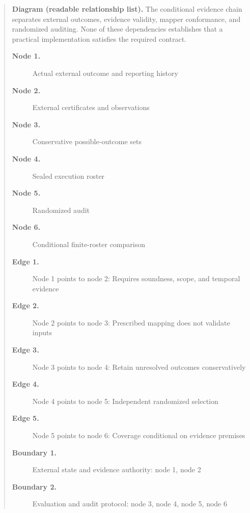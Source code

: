 \documentclass[11pt]{article}
\begin{document}
\begin{quote}
\textbf{Diagram (readable relationship list).} The conditional evidence chain separates external outcomes, evidence validity, mapper conformance, and randomized auditing. None of these dependencies establishes that a practical implementation satisfies the required contract.
\begin{description}
\item[\textbf{Node 1.}] Actual external outcome and reporting history
\item[\textbf{Node 2.}] External certificates and observations
\item[\textbf{Node 3.}] Conservative possible-outcome sets
\item[\textbf{Node 4.}] Sealed execution roster
\item[\textbf{Node 5.}] Randomized audit
\item[\textbf{Node 6.}] Conditional finite-roster comparison
\item[\textbf{Edge 1.}] Node 1 points to node 2: Requires soundness, scope, and temporal evidence
\item[\textbf{Edge 2.}] Node 2 points to node 3: Prescribed mapping does not validate inputs
\item[\textbf{Edge 3.}] Node 3 points to node 4: Retain unresolved outcomes conservatively
\item[\textbf{Edge 4.}] Node 4 points to node 5: Independent randomized selection
\item[\textbf{Edge 5.}] Node 5 points to node 6: Coverage conditional on evidence premises
\item[\textbf{Boundary 1.}] External state and evidence authority: node 1, node 2
\item[\textbf{Boundary 2.}] Evaluation and audit protocol: node 3, node 4, node 5, node 6
\end{description}
\par{}
\end{quote}
\end{document}
